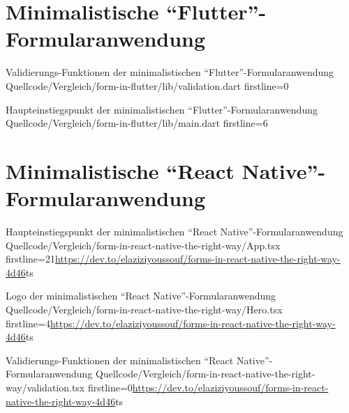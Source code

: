 

\chapter{Minimalistische \enquote{Flutter}-Formularanwendung}
\label{chap:VergleichFlutter}

\begin{alexlisting}{}{Validierungs-Funktionen der minimalistischen \enquote{Flutter}-Formularanwendung}
  {Quellcode/Vergleich/form-in-flutter/lib/validation.dart}
  {firstline=0}
  \label{lst:VergleichFlutterValidation}
\end{alexlisting}

\renewcommand{\fcolorbox}[4][]{#4}
\begin{alexlisting}{}{Haupteinstiegspunkt der minimalistischen \enquote{Flutter}-Formularanwendung}
  {Quellcode/Vergleich/form-in-flutter/lib/main.dart}
  {firstline=6}
  \label{lst:VergleichFlutterMain}
\end{alexlisting}

\clearpage
\chapter{Minimalistische \enquote{React Native}-Formularanwendung} 
\label{chap:VergleichReactNatveApp}

\begin{fremdeslisting}{}{Haupteinstiegspunkt der minimalistischen \enquote{React Native}-Formularanwendung}
  {Quellcode/Vergleich/form-in-react-native-the-right-way/App.tsx}
  {firstline=21}{\url{https://dev.to/elaziziyoussouf/forms-in-react-native-the-right-way-4d46}}{ts}

  \label{lst:VergleichReactNatveApp}

\end{fremdeslisting}

\begin{fremdeslisting}{}{Logo der minimalistischen \enquote{React Native}-Formularanwendung}
  {Quellcode/Vergleich/form-in-react-native-the-right-way/Hero.tsx}
  {firstline=4}{\url{https://dev.to/elaziziyoussouf/forms-in-react-native-the-right-way-4d46}}{ts}

  \label{lst:VergleichReactNatveHero}

\end{fremdeslisting}

\begin{fremdeslisting}{}{Validierungs-Funktionen der minimalistischen \enquote{React Native}-Formularanwendung}
  {Quellcode/Vergleich/form-in-react-native-the-right-way/validation.tsx}
  {firstline=0}{\url{https://dev.to/elaziziyoussouf/forms-in-react-native-the-right-way-4d46}}{ts}

  \label{lst:VergleichReactNatveValidation}

\end{fremdeslisting}
 
